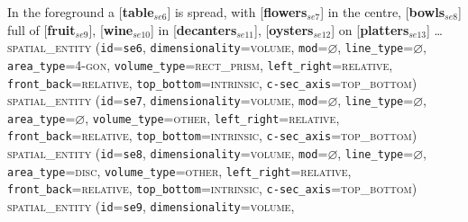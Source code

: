 \documentclass[11pt]{article}
\newcommand{\entity}[2]{[\textbf{\color{darkblue}#1}$_{se#2}$]}
\begin{document}
{    \item In the foreground a \entity{table}{6} is spread, with \entity{flowers}{7} in the centre, \entity{bowls}{8} full of \entity{fruit}{9}, \entity{wine}{10} in \entity{decanters}{11}, \entity{oysters}{12} on \entity{platters}{13} \ldots\vspace{0.5em}\\
        \textsc{spatial\_entity}
            (\texttt{id}=\texttt{se6},
            \texttt{dimensionality}=\textsc{volume},
            \texttt{mod}=$\varnothing$,
            \texttt{line\_type}=$\varnothing$,\\
            \texttt{area\_type}=\textsc{4-gon},
            \texttt{volume\_type}=\textsc{rect\_prism},
            \texttt{left\_right}=\textsc{relative},\\
            \texttt{front\_back}=\textsc{relative},
            \texttt{top\_bottom}=\textsc{intrinsic},
            \texttt{c-sec\_axis}=\textsc{top\_bottom})\vspace{0.5em}\\
        \textsc{spatial\_entity}
            (\texttt{id}=\texttt{se7},
            \texttt{dimensionality}=\textsc{volume},
            \texttt{mod}=$\varnothing$,
            \texttt{line\_type}=$\varnothing$,\\
            \texttt{area\_type}=$\varnothing$,
            \texttt{volume\_type}=\textsc{other},
            \texttt{left\_right}=\textsc{relative},\\
            \texttt{front\_back}=\textsc{relative},
            \texttt{top\_bottom}=\textsc{intrinsic},
            \texttt{c-sec\_axis}=\textsc{top\_bottom})\vspace{0.5em}\\
        \textsc{spatial\_entity}
            (\texttt{id}=\texttt{se8},
            \texttt{dimensionality}=\textsc{volume},
            \texttt{mod}=$\varnothing$,
            \texttt{line\_type}=$\varnothing$,\\
            \texttt{area\_type}=\textsc{disc},
            \texttt{volume\_type}=\textsc{other},
            \texttt{left\_right}=\textsc{relative},\\
            \texttt{front\_back}=\textsc{relative},
            \texttt{top\_bottom}=\textsc{intrinsic},
            \texttt{c-sec\_axis}=\textsc{top\_bottom})\vspace{0.5em}\\
        \textsc{spatial\_entity}
            (\texttt{id}=\texttt{se9},
            \texttt{dimensionality}=\textsc{volume},
}
\end{document}
